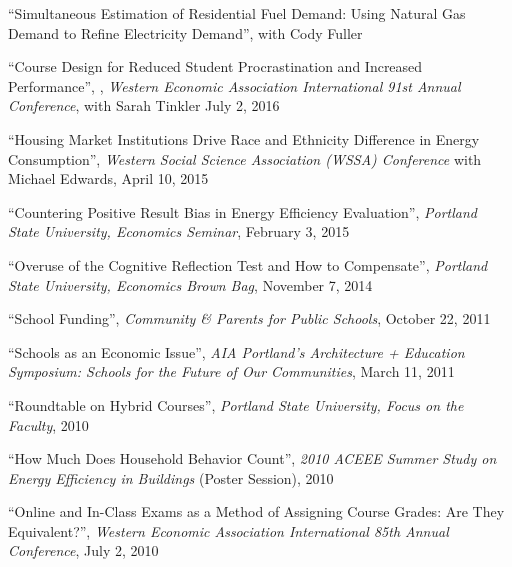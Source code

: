 \documentclass[Computer Science]{vita}
\begin{document}
\begin{vita}
\begin{Publications}
\begin{Work in progress}
\item ``Simultaneous Estimation of Residential Fuel Demand: Using Natural Gas Demand to Refine Electricity Demand'', with Cody Fuller


 



    \end{Work in progress}

  \end{Publications}

  \begin{Presentations and Invited Talks}
  
    \item ``Course Design for Reduced Student Procrastination and Increased Performance'', , \emph{Western Economic Association International 91st Annual Conference}, with Sarah Tinkler July 2, 2016
  
  \item ``Housing Market Institutions Drive Race and Ethnicity Difference in Energy Consumption'', \emph{Western Social Science Association (WSSA) Conference} with Michael Edwards, April 10, 2015
  
  \item ``Countering Positive Result Bias in Energy Efficiency Evaluation'', \emph{Portland State University, Economics Seminar}, February 3, 2015
  
  
  \item ``Overuse of the Cognitive Reflection Test and How to Compensate'', \emph{Portland State University, Economics Brown Bag}, November 7, 2014
   
  
  \item ``School Funding'', \emph{Community \& Parents for Public Schools}, October 22, 2011
  
\item ``Schools as an Economic Issue'', \emph{AIA Portland's Architecture + Education Symposium: Schools for the Future of Our Communities}, March 11, 2011

\item ``Roundtable on Hybrid Courses'', \emph{Portland State University, Focus on the Faculty}, 2010

  \item ``How Much Does Household Behavior Count'', \emph{2010 ACEEE
      Summer Study on Energy Efficiency in Buildings} (Poster
    Session), 2010
	  
  \item ``Online and In-Class Exams as a Method of Assigning Course
    Grades: Are They Equivalent?'', \emph{Western Economic Association
      International 85th Annual Conference}, July 2, 2010


\end{Presentations and Invited Talks}
\end{vita}
\end{document}

